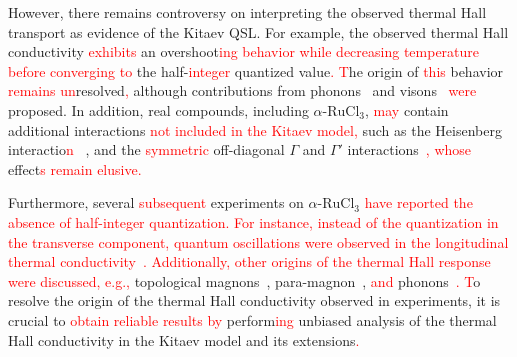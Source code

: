 \documentclass[twocolumn,superscriptaddress,showpacs, longbibliography, aps, prb]{revtex4-2}
\newcommand{\red}[1]{\textcolor{red}{#1}}
\begin{document}
However, there remains controversy on interpreting the observed thermal Hall transport as %
evidence of the Kitaev QSL. 
For example, the observed thermal Hall conductivity %
\red{exhibits} an overshoot\red{ing behavior while decreasing temperature before converging to} %
the half-\red{integer} quantized value\red{.} 
\red{T}he origin of %
\red{this} behavior %
\red{remains un}resolved\red{,}  %
although contributions from phonons~\cite{Ye2018Quantization,Vinkler2018} and visons~\cite{Joy2022} %
\red{were} proposed. 
In addition, real compounds, including $\alpha$-$\mathrm{RuCl_3}$, %
\red{may} contain additional interactions \red{not included in the Kitaev model,} 
such as the Heisenberg interactio\red{n}%
~\cite{Chaloupka_PRL2010,Chaloupka_PRL2013}, and the \red{symmetric} off-diagonal $\Gamma$ and $\Gamma'$ interactions~\cite{Rau2014,Rau2014pre,Winter2016}\red{, whose} %
effect\red{s remain elusive.} %

Furthermore, several %
\red{subsequent} experiments %
on $\alpha$-$\mathrm{RuCl_3}$ %
\red{have reported the absence of half-integer quantization.} 
\red{For instance, instead of the quantization in the transverse component, %
quantum oscillations \red{were} observed in the longitudinal thermal conductivity~\cite{Czajka_NPhy2021}\red{. Additionally}, 
other origins of the thermal Hall response were discussed, e.g.,} topological magnons~\red{\cite{Czajka_NMat2023,McClartyDGRPMP2018,Joshi2018}}, 
 para-magnon~\cite{Hentrich_PRB2019}, \red{and}
 phonons~\cite{Lefra_PRX2022}\red{. 
T}o resolve the origin of the thermal Hall conductivity observed in experiments, 
it is %
crucial to \red{obtain reliable results by} perform\red{ing} unbiased analysis  
of the thermal Hall conductivity in the Kitaev model and its extensions\red{.} %
\end{document}

